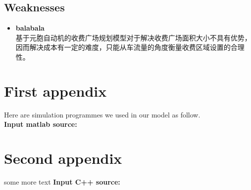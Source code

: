 \documentclass{mcmthesis}
\begin{document}
\subsection{Weaknesses}
\begin{itemize}
	\item \textbf{balabala}\\
	基于元胞自动机的收费广场规划模型对于解决收费广场面积大小不具有优势，因而解决成本有一定的难度，只能从车流量的角度衡量收费区域设置的合理性。
\end{itemize}
\newpage


\newpage


\begin{appendices}

\section{First appendix}

\lipsum[13]

Here are simulation programmes we used in our model as follow.\\

\textbf{\textcolor[rgb]{0.98,0.00,0.00}{Input matlab source:}}


\section{Second appendix}

some more text \textcolor[rgb]{0.98,0.00,0.00}{\textbf{Input C++ source:}}


\end{appendices}
\end{document}
